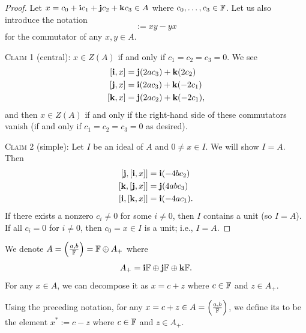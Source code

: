 \begin{proof}
Let $x=c_{0}+\mathbf{i}c_{1}+\mathbf{j}c_{2}+\mathbf{k}c_{3}\in A$ where $c_{0},\dots,c_{3}\in\mathbb{F}$.
Let us also introduce the notation
\begin{equation}
[x,y]:=xy-yx
\end{equation}
for the commutator of any $x,y\in A$.

\textsc{Claim 1} (central): $x\in Z(A)$ if and only if $c_{1}=c_{2}=c_{3}=0$.
We see
\begin{subequations}
  \begin{align}
[\quat{i},x] &=\quat{j}(2ac_{3})+\quat{k}(2c_{2})\\
[\quat{j},x] &=\quat{i}(2ac_{3})+\quat{k}(-2c_{1})\\
[\quat{k},x] &=\quat{j}(2ac_{2})+\quat{k}(-2c_{1}),
  \end{align}
\end{subequations}
and then $x\in Z(A)$ if and only if the right-hand side of these
commutators vanish (if and only if $c_{1}=c_{2}=c_{3}=0$ as desired).

\textsc{Claim 2} (simple): Let $I$ be an ideal of $A$ and $0\neq x\in I$.
We will show $I=A$. Then
\begin{subequations}
  \begin{align}
[\quat{j},[\quat{i},x]] &=\quat{i}(-4bc_{2})\\
[\quat{k},[\quat{j},x]] &=\quat{j}(4abc_{3})\\
[\quat{i},[\quat{k},x]] &=\quat{i}(-4ac_{1}).
  \end{align}
\end{subequations}
If there exists a nonzero $c_{i}\neq0$ for some $i\neq0$, then $I$ contains a unit (so
$I=A$). If all $c_{i}=0$ for $i\neq0$, then $c_{0}=x\in I$ is a unit; i.e., $I=A$.
\end{proof}

\begin{notation}
We denote $A=\left(\frac{a,b}{\mathbb{F}}\right)=\mathbb{F}\oplus A_{+}$ where
\begin{equation}
A_{+}=\mathbf{i}\mathbb{F}\oplus\mathbf{j}\mathbb{F}\oplus\mathbf{k}\mathbb{F}.
\end{equation}
For any $x\in A$, we can decompose it as $x=c+z$ where $c\in\mathbb{F}$ and
$z\in A_{+}$.
\end{notation}

\begin{definition}
Using the preceding notation, for any $x=c+z\in A=\left(\frac{a,b}{\mathbb{F}}\right)$,
we define its  to be the element $x^{*}:=c-z$ where
$c\in\mathbb{F}$ and $z\in A_{+}$.
\end{definition}

